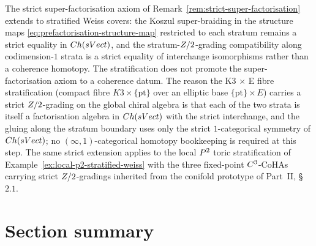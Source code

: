 \begin{remark}
\label{rem:strict-super-factorisation-stratified}
The strict super-factorisation axiom of
Remark~\ref{rem:strict-super-factorisation} extends to stratified
Weiss covers: the Koszul super-braiding in the structure maps
\eqref{eq:prefactorisation-structure-map} restricted to each stratum
remains a strict equality in $Ch(sVect)$, and the
stratum-$Z/2$-grading compatibility along codimension-$1$ strata is a
strict equality of interchange isomorphisms rather than a coherence
homotopy. The stratification does not promote the super-factorisation
axiom to a coherence datum. The reason the K3 $\times$ E fibre
stratification (compact fibre $K3 \times \{\mathrm{pt}\}$ over an
elliptic base $\{\mathrm{pt}\} \times E$) carries a strict
$Z/2$-grading on the global chiral algebra is that each of the two
strata is itself a factorisation algebra in $Ch(sVect)$ with the
strict interchange, and the gluing along the stratum boundary uses
only the strict $1$-categorical symmetry of $Ch(sVect)$; no
$(\infty, 1)$-categorical homotopy bookkeeping is required at this
step. The same strict extension applies to the local $P^2$ toric
stratification of Example~\ref{ex:local-p2-stratified-weiss} with
the three fixed-point $C^3$-CoHAs carrying strict $Z/2$-gradings
inherited from the conifold prototype of Part~II, \S$2.1$.
\end{remark}

\section*{Section summary}

